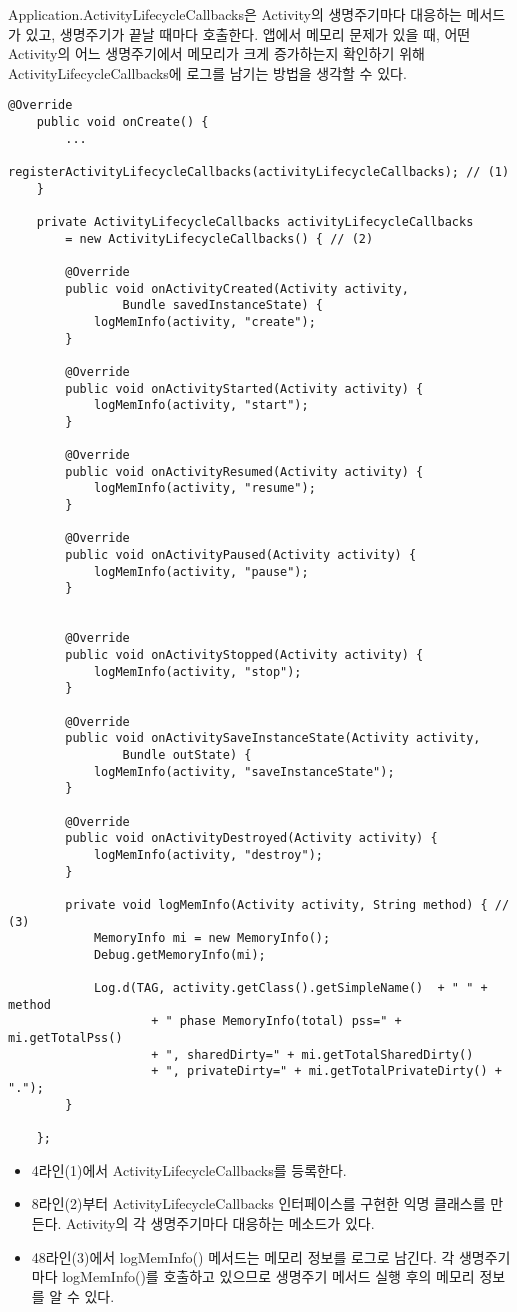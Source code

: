 Application.ActivityLifecycleCallbacks은 Activity의 생명주기마다 대응하는 메서드가 있고, 생명주기가 끝날 때마다 호출한다.
앱에서 메모리 문제가 있을 때, 어떤 Activity의 어느 생명주기에서 메모리가 크게 증가하는지 확인하기 위해 ActivityLifecycleCallbacks에 로그를 남기는 방법을 생각할 수 있다.
\begin{lstlisting}[frame=single] 
	@Override
	public void onCreate() {
		...
		registerActivityLifecycleCallbacks(activityLifecycleCallbacks); // (1)
	}
	
	private ActivityLifecycleCallbacks activityLifecycleCallbacks 
		= new ActivityLifecycleCallbacks() { // (2)
		
		@Override
		public void onActivityCreated(Activity activity, 
				Bundle savedInstanceState) {
			logMemInfo(activity, "create");
		}
		
		@Override
		public void onActivityStarted(Activity activity) {
			logMemInfo(activity, "start");
		}
		
		@Override
		public void onActivityResumed(Activity activity) {
			logMemInfo(activity, "resume");
		}
		
		@Override
		public void onActivityPaused(Activity activity) {
			logMemInfo(activity, "pause");
		}

		
		@Override
		public void onActivityStopped(Activity activity) {
			logMemInfo(activity, "stop");
		}
		
		@Override
		public void onActivitySaveInstanceState(Activity activity, 
				Bundle outState) {
			logMemInfo(activity, "saveInstanceState");
		}
		
		@Override
		public void onActivityDestroyed(Activity activity) {
			logMemInfo(activity, "destroy");
		}
		
		private void logMemInfo(Activity activity, String method) { // (3)
			MemoryInfo mi = new MemoryInfo(); 
			Debug.getMemoryInfo(mi);
			
			Log.d(TAG, activity.getClass().getSimpleName()  + " " + method 
					+ " phase MemoryInfo(total) pss=" + mi.getTotalPss() 
					+ ", sharedDirty=" + mi.getTotalSharedDirty() 
					+ ", privateDirty=" + mi.getTotalPrivateDirty() + "."); 
		}
	
	};
\end{lstlisting}
\begin{itemize}
\item 4라인(1)에서 ActivityLifecycleCallbacks를 등록한다.
\item 8라인(2)부터 ActivityLifecycleCallbacks 인터페이스를 구현한 익명 클래스를 만든다. Activity의 각 생명주기마다 대응하는 메소드가 있다.
\item 48라인(3)에서 logMemInfo() 메서드는 메모리 정보를 로그로 남긴다. 각 생명주기마다 logMemInfo()를 호출하고 있으므로 생명주기 메서드 실행 후의 메모리 정보를 알 수 있다.
\end{itemize}

